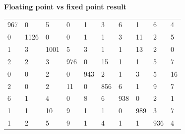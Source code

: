 \documentclass[xcolor=dvipsnames]{beamer}
\begin{document}
\begin{frame}{\bf Floating point vs fixed point result}
{%
\begin{table}[]
\centering
\label{my-label}
\begin{tabular}{llllllllll}
967                                      & 0                                       & 5               & 0               & 1               & 3               & 6               & 1               & 6               & 4               \\
0                                        & 1126                                    & 0               & 0               & 1               & 1               & 3               & 11              & 2               & 5               \\
1                                        & 3                                       & 1001            & 5               & 3               & 1               & 1               & 13              & 2               & 0               \\
2                                        & 2                                       & 3               & 976             & 0               & 15              & 1               & 1               & 5               & 7               \\
0                                        & 0                                       & 2               & 0               & 943             & 2               & 1               & 3               & 5               & 16              \\
2                                        & 0                                       & 2               & 11              & 0               & 856             & 6               & 1               & 9               & 7               \\
6                                        & 1                                       & 4               & 0               & 8               & 6               & 938             & 0               & 2               & 1               \\
1                                        & 1                                       & 10              & 9               & 1               & 1               & 0               & 989             & 3               & 7               \\
1                                        & 2                                       & 5               & 9               & 1               & 4               & 1               & 1               & 936             & 4               \\

\end{tabular}
\end{table}}
\end{frame}
\end{document}
